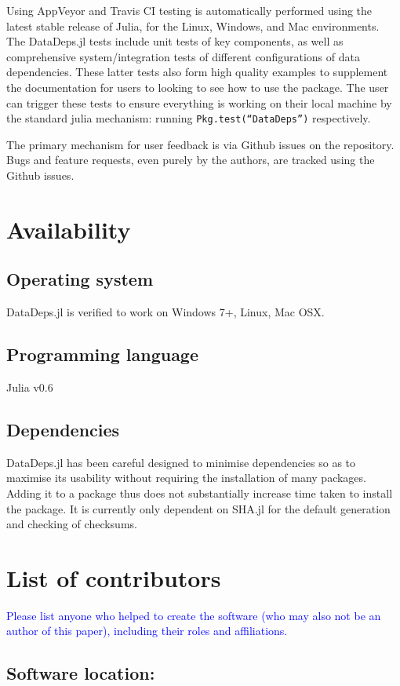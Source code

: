 \documentclass{jors}
\begin{document}
Using AppVeyor and Travis CI testing is automatically performed using the latest stable release of Julia, for the Linux, Windows, and Mac environments.
The DataDeps.jl tests include unit tests of key components, as well as comprehensive system/integration tests of different configurations of data dependencies.
These latter tests also form high quality examples to supplement the documentation for users to looking to see how to use the package.
The user can trigger these tests to ensure everything is working on their local machine by the standard julia mechanism: running \texttt{Pkg.test(``DataDeps'')} respectively.


The primary mechanism for user feedback is via Github issues on the repository.
Bugs and feature requests, even purely by the authors, are tracked using the Github issues.

\section{Availability}
\subsection{Operating system}
DataDeps.jl is verified to work on Windows 7+, Linux, Mac OSX.

\subsection{Programming language}
Julia v0.6

\subsection{Dependencies}
DataDeps.jl has been careful designed to minimise dependencies so as to maximise its usability without requiring the installation of many packages.
Adding it to a package thus does not substantially increase time taken to install the package.
It is currently only dependent on SHA.jl for the default generation and checking of checksums.

\section*{List of contributors}

\textcolor{blue}{Please list anyone who helped to create the software (who may also not be an author of this paper), including their roles and affiliations.}

\subsection{Software location:}
\end{document}

